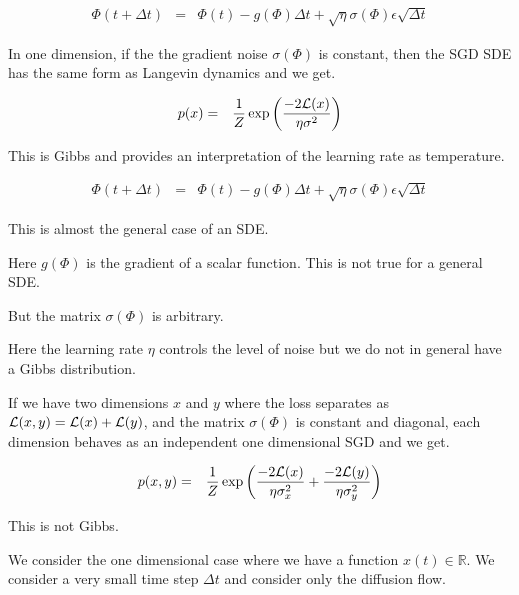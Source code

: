 {

\begin{eqnarray*}
\Phi(t + \Delta t) & = & \Phi(t) -g(\Phi)\Delta t + \sqrt{\eta} \sigma(\Phi) \epsilon\sqrt{\Delta t}
\end{eqnarray*}

\vfill
In one dimension, if the the gradient noise $\sigma(\Phi)$ is constant, then the SGD SDE has the same form as Langevin dynamics and we get.

\begin{eqnarray*}
p(x) & = & \frac{1}{Z} \exp\left(\frac{-2{\cal L}(x)}{ \eta \sigma^2}\right)
\end{eqnarray*}

\vfill
This is Gibbs and provides an interpretation of the learning rate as temperature.



\begin{eqnarray*}
\Phi(t + \Delta t) & = & \Phi(t) -g(\Phi)\Delta t + \sqrt{\eta} \sigma(\Phi) \epsilon\sqrt{\Delta t}
\end{eqnarray*}

\vfill
This is almost the general case of an SDE.

\vfill
Here $g(\Phi)$ is the gradient of a scalar function.  This is not true for a general SDE.

\vfill
But the matrix $\sigma(\Phi)$ is arbitrary.

\vfill
Here the learning rate $\eta$ controls the level of noise but we do not in general have a Gibbs distribution.



If we have two dimensions $x$ and $y$ where the loss separates as ${\cal L}(x,y) = {\cal L}(x) + {\cal L}(y)$, and the matrix $\sigma(\Phi)$ is constant and diagonal,
each dimension behaves as an independent one dimensional SGD and we get.

\begin{eqnarray*}
p(x,y) & = & \frac{1}{Z} \exp\left(\frac{-2{\cal L}(x)}{ \eta \sigma_x^2} + \frac{-2{\cal L}(y)}{\eta \sigma_y^2}\right)
\end{eqnarray*}

\vfill
This is not Gibbs.





{\Large
We consider the one dimensional case where we have a function $x(t) \in \mathbb{R}$.  We consider a very small time step $\Delta t$ and consider only the diffusion flow.

}}
